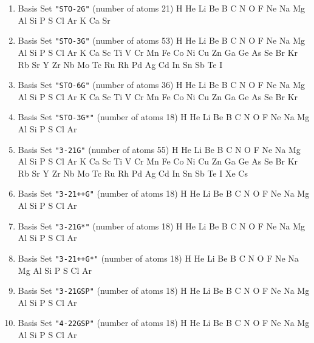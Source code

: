 \begin{enumerate}

\item Basis Set \verb#"STO-2G"# (number of atoms 21)  \newline
  H He Li Be B C N O F Ne Na Mg Al Si P S Cl Ar K Ca Sr


\item Basis Set \verb#"STO-3G"# (number of atoms 53)  \newline
  H He Li Be B C N O F Ne Na Mg Al Si P S Cl Ar K Ca Sc Ti V Cr Mn
 Fe Co Ni Cu Zn Ga Ge As Se Br Kr Rb Sr Y Zr Nb Mo Tc Ru Rh Pd Ag Cd In Sn
 Sb Te I


\item Basis Set \verb#"STO-6G"# (number of atoms 36)  \newline
  H He Li Be B C N O F Ne Na Mg Al Si P S Cl Ar K Ca Sc Ti V Cr Mn
 Fe Co Ni Cu Zn Ga Ge As Se Br Kr


\item Basis Set \verb#"STO-3G*"# (number of atoms 18)  \newline
  H He Li Be B C N O F Ne Na Mg Al Si P S Cl Ar


\item Basis Set \verb#"3-21G"# (number of atoms 55)  \newline
  H He Li Be B C N O F Ne Na Mg Al Si P S Cl Ar K Ca Sc Ti V Cr Mn
 Fe Co Ni Cu Zn Ga Ge As Se Br Kr Rb Sr Y Zr Nb Mo Tc Ru Rh Pd Ag Cd In Sn
 Sb Te I Xe Cs


\item Basis Set \verb#"3-21++G"# (number of atoms 18)  \newline
  H He Li Be B C N O F Ne Na Mg Al Si P S Cl Ar


\item Basis Set \verb#"3-21G*"# (number of atoms 18)  \newline
  H He Li Be B C N O F Ne Na Mg Al Si P S Cl Ar


\item Basis Set \verb#"3-21++G*"# (number of atoms 18)  \newline
  H He Li Be B C N O F Ne Na Mg Al Si P S Cl Ar


\item Basis Set \verb#"3-21GSP"# (number of atoms 18)  \newline
  H He Li Be B C N O F Ne Na Mg Al Si P S Cl Ar


\item Basis Set \verb#"4-22GSP"# (number of atoms 18)  \newline
  H He Li Be B C N O F Ne Na Mg Al Si P S Cl Ar


\end{enumerate}
